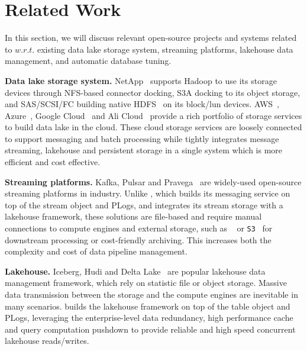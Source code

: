 \section{Related Work} 
\label{sec:related}


In this section, we will discuss relevant open-source projects and systems related to \sys $w.r.t.$ existing data lake storage system, streaming platforms, lakehouse data management, and automatic database tuning.




\noindent\textbf{Data lake storage system.}  NetApp~\cite{netapp} supports Hadoop to use its storage devices through NFS-based connector docking, 
S3A docking to its object storage, and SAS/SCSI/FC building native HDFS~\cite{hdfs} on its block/lun devices. AWS~\cite{aws}, Azure~\cite{azure}, Google Cloud~\cite{google} and Ali Cloud~\cite{ali} provide a rich portfolio of storage services  to build data lake in the cloud. These cloud storage services are loosely connected to support messaging and batch processing while \sys tightly integrates message streaming, lakehouse and persistent storage in a single system which is more efficient and cost effective.


\noindent\textbf{Streaming platforms.} Kafka, Pulsar and Pravega~\cite{kafka, pulsa, pravega} are widely-used open-source streaming platforms in industry.  Unlike \sys, which builds its messaging service on top of the stream object and PLogs, and integrates its stream storage with a lakehouse framework, these solutions are file-based and require manual connections to compute engines and external storage, such as \hdfs~\cite{hdfs} or \texttt{S3}~\cite{s3} for downstream processing or cost-friendly archiving. This increases both the complexity and cost of data pipeline management.




\noindent\textbf{Lakehouse.} Iceberg, Hudi and Delta Lake~\cite{iceberg,hudi,delta} are popular  lakehouse data management framework, which rely on statistic file or object storage. 
Massive data transmission between the storage and the compute engines are inevitable in many scenarios. 
 \sys builds the lakehouse framework on top of the table object and PLogs, leveraging the enterprise-level data redundancy, high performance cache and query computation pushdown to provide reliable and high speed concurrent lakehouse reads/writes. 
 









